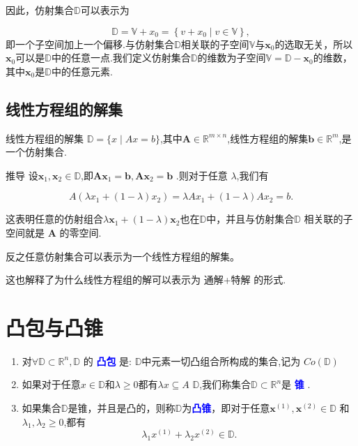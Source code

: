 \documentclass{lzureport}
\begin{document}
因此，仿射集合$\mathbb{D}$可以表示为

$$\mathbb{D}=\mathbb{V}+x_0=\left\{v+x_0\mid v\in\mathbb{V}\right\},$$
即一个子空间加上一个偏移.与仿射集合$\mathbb{D}$相关联的子空间$\mathbb{V}$与$\boldsymbol x_0$的选取无关，所以$\boldsymbol x_0$可以是$\mathbb{D}$中的任意一点.我们定义仿射集合$\mathbb{D}$的维数为子空间$\mathbb{V}=\mathbb{D}-\boldsymbol{x}_0$的维数，其中$\boldsymbol x_0$是$\mathbb{D}$中的任意元素.

\subsection{线性方程组的解集}

线性方程组的解集 $\mathbb{D}=\{x\mid Ax=b\}$,其中$\boldsymbol{A}\in\mathbb{R}^{m\times n}$,\textcolor{YBXPurple}{线性方程组的解集$\boldsymbol{b}\in\mathbb{R}^m$,是一个仿射集合}. 


\begin{derivation}{推导}
	设$\boldsymbol x_1,\boldsymbol{x}_2\in\mathbb{D}$,即$\boldsymbol{Ax}_1=\boldsymbol{b},\boldsymbol{Ax}_2=\boldsymbol{b}$ .则对于任意 $\lambda$,我们有

$$A\left(\lambda x_1+(1-\lambda)x_2\right)=\lambda Ax_1+(1-\lambda)Ax_2=b.$$

这表明任意的仿射组合$\lambda\boldsymbol x_1+(1-\lambda)\boldsymbol x_2$也在$\mathbb{D}$中，并且与仿射集合$\mathbb{D}$
相关联的子空间就是 $\boldsymbol{A}$ 的零空间.

反之任意仿射集合可以表示为一个线性方程组的解集。

这也解释了为什么线性方程组的解可以表示为 \textcolor{YBXPurple}{通解+特解} 的形式.
\end{derivation}

\section{凸包与凸锥}
\begin{enumerate}[label=\arabic*)]
	\item 对$\forall\mathbb{D}\subset\mathbb{R}^n,\mathbb{D}$ 的 \textcolor{blue}{\textbf{凸包}} 是: $\mathbb{D}$中元素一切凸组合所构成的集合,记为 $Co(\mathbb{D})$

	\item 如果对于任意$x\in\mathbb{D}$和$\lambda\geqslant0$都有$\lambda x\subseteq A$ $\mathbb{D}$,我们称集合$\mathbb{D}\subset\mathbb{R}^n$是 \textcolor{blue}{\textbf{锥}} .
	
	\item 如果集合$\mathbb{D}$是锥，并且是凸的，则称$\mathbb{D}$为\textcolor{blue}{\textbf{凸锥}}，即对于任意$\boldsymbol{x}^{(1)},\boldsymbol{x}^{(2)}\in\mathbb{D}$ 和 $\lambda_1,\lambda_2\geqslant0$,都有
	$$\lambda_1x^{(1)}+\lambda_2x^{(2)}\in\mathbb{D}.$$
\end{enumerate}
\end{document}
